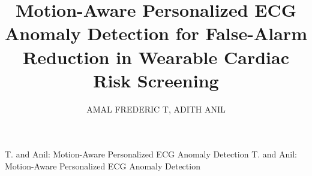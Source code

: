 \documentclass{ieeeaccess}
\begin{document}

\title{Motion-Aware Personalized ECG Anomaly Detection for False-Alarm Reduction in Wearable Cardiac Risk Screening}

\author{
\uppercase{Amal Frederic T},
\uppercase{Adith Anil}
}

\address[1]{School of Computer Science and Engineering, Vellore Institute of Technology, Vellore 632014, Tamil Nadu, India (e-mail: amal.frederict@vit.ac.in)}
\address[2]{School of Computer Science and Engineering, Vellore Institute of Technology, Vellore 632014, Tamil Nadu, India (e-mail: adith.anil2024@vitstudent.ac.in)}

\markboth
{T. and Anil: Motion-Aware Personalized ECG Anomaly Detection}
{T. and Anil: Motion-Aware Personalized ECG Anomaly Detection}

\end{document}

